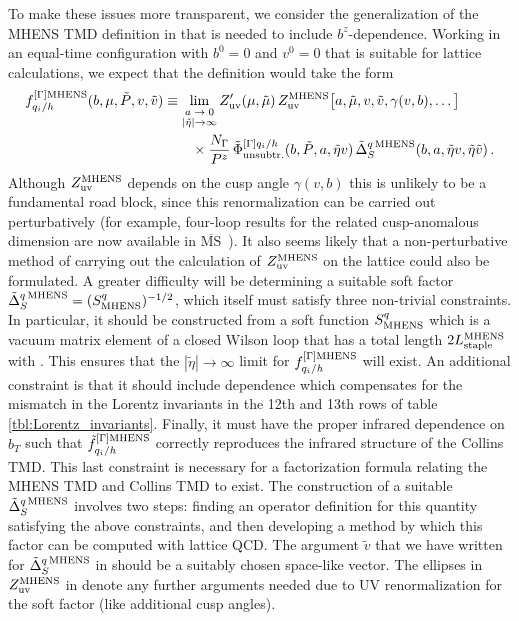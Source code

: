 \documentclass[11pt,a4paper]{article}
\newcommand{\MSbar}{{\overline{\mathrm{MS}}}}
\newcommand{\nn}{\nonumber}
\newcommand{\q}{q_i}
\begin{document}
To make these issues more transparent, we consider the generalization of the MHENS TMD definition in  that is needed to include $b^z$-dependence. Working in an equal-time configuration with $b^0=0$ and $v^0=0$ that is suitable for lattice calculations, we expect that the definition would take the form 
\begin{align} \label{eq:tmdMHENS}
 f_{\q/h}^{[\Gamma]{\rm MHENS}}(b,\mu, \tilde P, v, \tilde v)
  &\equiv \lim_{\stackrel{\text{\scriptsize $a\to0$}}{|\tilde\eta|\to\infty}}
  Z'_{\rm uv}(\mu,\tilde \mu)\, 
  Z_{\rm uv}^{\rm MHENS}\big[a, \tilde\mu,v,\tilde v, \gamma(v,b), \ldots \big]\,
 \\
&  \qquad \times 
 \frac{N_\Gamma}{P^z}\,
 \tilde \Phi_{\rm unsubtr.}^{[\Gamma]\q/h}(b,\tilde P,a,\tilde\eta v)\, 
 \tilde\Delta_S^{q\,{\rm MHENS}}(b, a, \tilde\eta v,\tilde\eta \tilde v)
\,.\nn
\end{align}
Although $Z_{\rm uv}^{\rm MHENS}$ depends on the cusp angle $\gamma(v,b)$ this is unlikely to be a fundamental road block, since this renormalization can be carried out perturbatively (for example, four-loop results for the related cusp-anomalous dimension are now available in $\MSbar$~\cite{Henn:2019swt}). 
It also seems likely that a non-perturbative method of carrying out the calculation of $Z_{\rm uv}^{\rm MHENS}$ on the lattice could also be formulated.
A greater difficulty will be determining a suitable soft factor $\tilde\Delta_S^{q\,{\rm MHENS}} = (S^{q}_{\rm MHENS})^{-1/2}$, which itself must satisfy three non-trivial constraints. In particular, it should be constructed from a soft function $S^{q}_{\rm MHENS}$ which is a vacuum matrix element of a closed Wilson loop that has a total length $2L_{\rm staple}^{\rm MHENS}$ with . This ensures that the $|\tilde\eta|\to \infty$ limit for $f_{\q/h}^{[\Gamma]{\rm MHENS}}$ will exist. An additional constraint is that it should include dependence which compensates for the mismatch in the Lorentz invariants in the 12th and 13th rows of table \ref{tbl:Lorentz_invariants}.
Finally, it must have the proper infrared dependence on $b_T$ such that $\tilde f_{\q/h}^{[\Gamma]{\rm MHENS}}$ correctly reproduces the infrared structure of the Collins TMD. This last constraint is necessary for a factorization formula relating the MHENS TMD and Collins TMD to exist. The construction of a suitable $\tilde\Delta_S^{q\,{\rm MHENS}}$ involves two steps: finding an operator definition for this quantity satisfying the above constraints, and then developing a method by which this factor can be computed with lattice QCD. The argument $\tilde v$ that we have written for $\tilde\Delta_S^{q\,{\rm MHENS}}$ in  should be a suitably chosen space-like vector. The ellipses in $Z_{\rm uv}^{\rm MHENS}$ in  denote any further arguments needed due to UV renormalization for the soft factor (like additional cusp angles).
\end{document}
